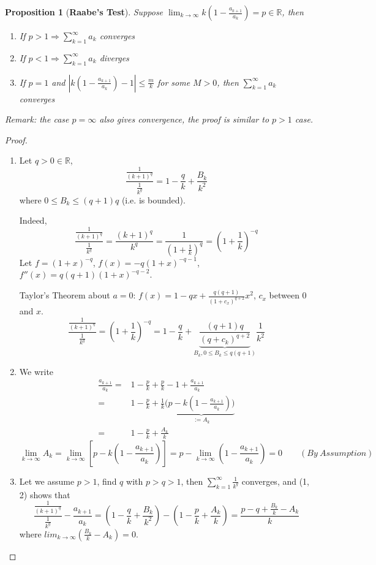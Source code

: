 \documentclass[12pt]{article}
\theoremstyle{plain}
\newtheorem{proposition}{Proposition}[subsection]
\newcommand{\abs}[1]{\left| #1 \right|}
\newcommand{\mR}{{\mathbb{R}}}
\begin{document}
\begin{proposition}[\textbf{Raabe's Test}]
	Suppose $\lim_{k\to\infty} k (1-\frac{a_{k+1}}{a_k}) = p \in \mR$,
	then 
	\begin{enumerate}
		\item If $p > 1 \Rightarrow \sum_{k=1}^{\infty} a_k$ converges
		\item If $p < 1 \Rightarrow \sum_{k=1}^{\infty} a_k$ diverges
		\item If $p = 1$ and $\abs{k(1-\frac{a_{k+1}}{a_k})-1}\leq \frac mk$ 
			for some $M>0$, then $\sum_{k=1}^{\infty} a_k$ converges
	\end{enumerate}
	\textit{Remark:} the case $p = \infty$ also gives convergence, the proof is
	similar to $p > 1$ case. 
\end{proposition}
\begin{proof}
	$ $
\begin{enumerate}
\item 
	Let $q>0 \in \mR$, 
	\[
		\frac{\frac 1{(k+1)^q}}{\frac 1{k^q}} = 1-\frac qk + \frac{B_k}{k^2}
	\]
	where $0 \leq B_k \leq (q+1)q$ (i.e. is bounded).

	Indeed, 
	\[
		\frac{\frac 1{(k+1)^q}}{\frac 1{k^q}} = 
		\frac{(k+1)^q}{k^q}
		= \frac1{(1+\frac1k)^q}
		= (1+\frac 1k)^{-q}
	\]
	Let $f = (1+x)^{-q}$, $f(x) = -q(1+x)^{-q-1}$, $f''(x) = q(q+1)(1+x)^{-q-2}$.

	Taylor's Theorem about $a = 0$: $\displaystyle f(x) = 1-qx + \frac{q(q+1)}{(1+c_x)^{q+2}}x^2$,
	$c_x$ between $0$ and $x$.
	\[
		\frac{\frac 1{(k+1)^q}}{\frac 1{k^q}} 
		= (1+\frac 1k)^{-q}
		= 1- \frac qk + 
		\underbrace{\frac{(q+1)q}{(q+c_k)^{q+2}}}_{B_k, 0\leq B_k \leq q(q+1)}
		\frac 1{k^2} 
	\]

\item
	We write 
	\begin{align*}
		\frac{a_{k+1}}{a_k} 
		=& 1-\frac pk + \frac pk - 1 + \frac{a_{k+1}}{a_k}	\\
	=& 1- \frac pk + \frac 1k (\underbrace{p-k(1-\frac {a_{k+1}}{a_k}))}_{:=A_k}\\
	=& 1- \frac pk + \frac{A_k}k
	\end{align*}
\[
	\lim_{k\to\infty} A_k = \lim_{k\to\infty} [p-k(1-\frac{a_{k+1}}{a_k})]
	= p - \lim_{k\to\infty} (1-\frac{a_{k+1}}{a_k}) = 0 
	\qquad (By \ Assumption)
\]

\item Let we assume $p > 1$, find $q$ with $p > q > 1$, then 
	$\sum_{k=1}^{\infty} \frac1{k^q}$ converges, and (1, 2) shows that 
	\[
		\frac{\frac 1{(k+1)^q}}{\frac 1{k^q}} - \frac{a_{k+1}}{a_k}
		 = (1-\frac qk + \frac{B_k}{k^2}) - (1-\frac pk + \frac{A_k}k)
		 = \frac{p-q+\frac{B_k}k - A_k}k
	\]
	where $lim_{k\to\infty}(\frac{B_k}k - A_k)=0$.
	

\end{enumerate}
\end{proof}
\end{document}
